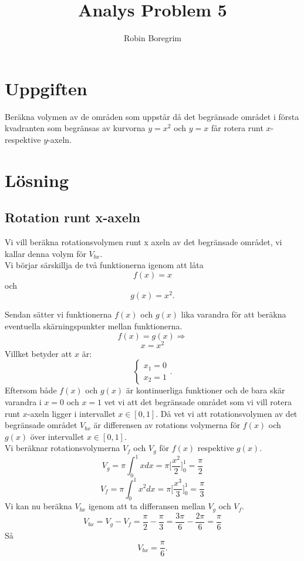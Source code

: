 \documentclass[11pt]{article}
\begin{document}
\title{Analys Problem 5}
\author{Robin Boregrim}
\maketitle
\renewcommand{\contentsname}{Innehållsförteckning}
\tableofcontents
\newpage
\section{Uppgiften}
Beräkna volymen av de områden som uppstår då det begränsade området i första kvadranten som begränsas av kurvorna $y = x^2$ och $y = x$ får rotera runt $x$- respektive  $y$-axeln.
\section{Lösning}

\subsection{Rotation runt x-axeln}
Vi vill beräkna rotationsvolymen runt x axeln av det begränsade området, vi kallar denna volym för $V_{bx}$.\\

Vi börjar särskillja de två funktionerna igenom att låta
$$f(x) = x$$och$$g(x) = x^2.$$


Sendan sätter vi funktionerna $f(x)$ och $g(x)$ lika varandra för att beräkna eventuella skärningspunkter mellan funktionerna.
$$f(x) = g(x) \Rightarrow$$
$$x = x^2$$
Villket betyder att $x$ är:
$$
\left\{\begin{array}{c}
x_1 = 0 \\ x_2 = 1
\end{array}\right. .$$
Eftersom både $f(x)$ och $g(x)$ är kontinuerliga funktioner och de bara skär varandra i $x=0$ och $x=1$ vet vi att det begränsade området som vi vill rotera runt $x$-axeln ligger  i intervallet $x\in[0,1]$. Då vet vi att rotationsvolymen av det begränsade området $V_{bx}$  är differensen av rotations volymerna för $f(x)$ och $g(x)$ över intervallet $x\in[0,1]$.\\
Vi beräknar rotationsvolymerna $V_f$ och $V_g$ för $f(x)$ respektive $g(x)$.
$$V_g = \pi \int_0^1 x dx = \pi \Big[\frac{x^2}{2}\Big]_0^1 = \frac{\pi}{2}$$
$$V_f = \pi \int_0^1 x^2 dx = \pi\Big[\frac{x^3}{3}\Big]_0^1 = \frac{\pi}{3}$$
Vi kan nu beräkna $V_{bx}$ igenom att ta differansen mellan $V_g$ och $V_f$.
$$V_{bx} = V_g - V_f = \frac{\pi}{2} - \frac{\pi}{3}= \frac{3\pi}{6} - \frac{2\pi}{6} = \frac{\pi}{6}$$
Så $$V_{bx} = \frac{\pi}{6}.$$ 
\end{document}
